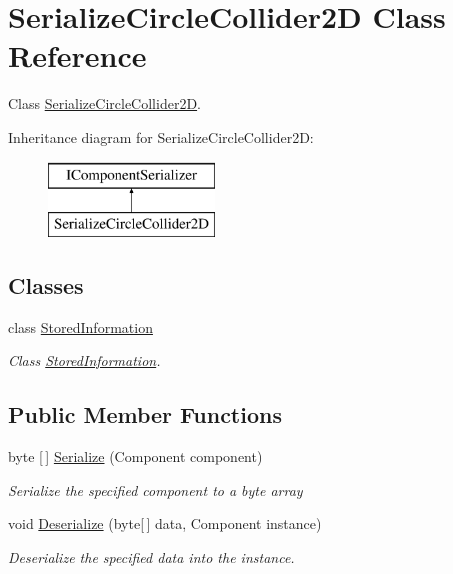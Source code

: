 \hypertarget{class_serialize_circle_collider2_d}{}\section{Serialize\+Circle\+Collider2D Class Reference}
\label{class_serialize_circle_collider2_d}


Class \hyperlink{class_serialize_circle_collider2_d}{Serialize\+Circle\+Collider2D}.  


Inheritance diagram for Serialize\+Circle\+Collider2D\+:\begin{figure}[H]
\begin{center}
\leavevmode
\includegraphics[height=2.000000cm]{class_serialize_circle_collider2_d}
\end{center}
\end{figure}
\subsection*{Classes}
\begin{DoxyCompactItemize}
\item 
class \hyperlink{class_serialize_circle_collider2_d_1_1_stored_information}{Stored\+Information}
\begin{DoxyCompactList}\small\item\em Class \hyperlink{class_serialize_circle_collider2_d_1_1_stored_information}{Stored\+Information}. \end{DoxyCompactList}\end{DoxyCompactItemize}
\subsection*{Public Member Functions}
\begin{DoxyCompactItemize}
\item 
byte \mbox{[}$\,$\mbox{]} \hyperlink{class_serialize_circle_collider2_d_afc9c9861ba6c6c9949d56c851dd095fa}{Serialize} (Component component)
\begin{DoxyCompactList}\small\item\em Serialize the specified component to a byte array \end{DoxyCompactList}\item 
void \hyperlink{class_serialize_circle_collider2_d_ae96fe731156dd3dad5f854f9fcb7ac19}{Deserialize} (byte\mbox{[}$\,$\mbox{]} data, Component instance)
\begin{DoxyCompactList}\small\item\em Deserialize the specified data into the instance. \end{DoxyCompactList}\end{DoxyCompactItemize}


